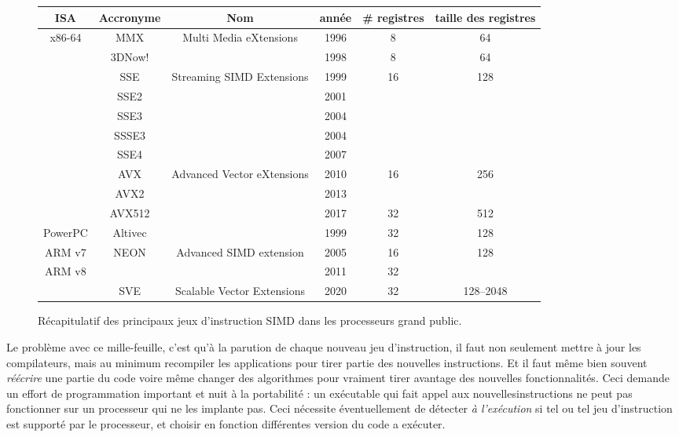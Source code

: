 \begin{figure}
\centering
  \begin{tabular}{|c||c|c|c|c|c|}
  \hline
  ISA & Accronyme & Nom & année & \# registres & taille des registres \\
  \hline  \hline
  \multirow{9}{*}{x86-64} & MMX & Multi Media eXtensions & 1996 & 8 & 64 \\
  \cline{2-6}
  & 3DNow! &                                            & 1998 & 8  &  64 \\
    \cline{2-6}
  & SSE    & \multirow{4}{*}{Streaming SIMD Extensions} & 1999 & \multirow{5}{*}{16} & \multirow{5}{*}{128} \\
  & SSE2   &                           & 2001 &         & \\
  & SSE3   &                           & 2004 &         & \\
  & SSSE3  &                           & 2004 &         & \\
  & SSE4   &                           & 2007 &         & \\
    \cline{2-6}
  & AVX    & \multirow{3}{*}{Advanced Vector eXtensions} & 2010 & \multirow{2}{*}{16} & \multirow{2}{*}{256} \\
  & AVX2   &                           & 2013  &    &     \\
    \cline{2-2}\cline{4-6}
  & AVX512 &                           & 2017  & 32 & 512 \\
  \hline\hline
  PowerPC & Altivec & & 1999 & 32 & 128 \\
  \hline\hline
  ARM v7 & \multirow{2}{*}{NEON} & \multirow{2}{*}{Advanced SIMD extension}    & 2005 & 16 & \multirow{2}{*}{128} \\
  \cline{1-1}%
  \multirow{2}{*}{ARM v8} &      &                            & 2011 & 32 &  \\
  \cline{2-6}
   & SVE  & Scalable Vector Extensions & 2020 & 32 & 128--2048 \\
  \hline
\end{tabular}  
\caption{Récapitulatif des principaux jeux d'instruction SIMD dans les processeurs grand public.\label{teb:SIMD-ISA}}
\end{figure}

Le problème avec ce mille-feuille, c'est qu'à la parution de chaque nouveau jeu
d'instruction, il faut non seulement mettre à jour les compilateurs, mais au
minimum recompiler les applications pour tirer partie des nouvelles
instructions. Et il faut même bien souvent \emph{réécrire} une partie du code
voire même changer des algorithmes pour vraiment tirer avantage des nouvelles
fonctionnalités. Ceci demande un effort de programmation important et nuit à la
portabilité : un exécutable qui fait appel aux \og nouvelles\fg instructions ne
peut pas fonctionner sur un processeur qui ne les implante pas. Ceci nécessite
éventuellement de détecter \emph{à l'exécution} si tel ou tel jeu d'instruction
est supporté par le processeur, et choisir en fonction différentes version du
code a exécuter.

